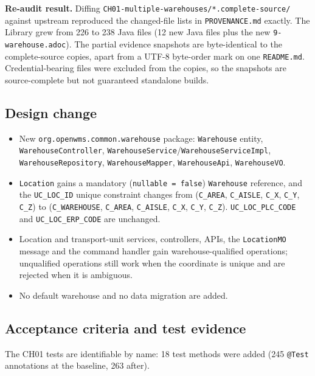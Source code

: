 \documentclass[11pt,a4paper]{article}
\newcommand{\code}[1]{\nolinkurl{#1}}
\begin{document}
\textbf{Re-audit result.} Diffing \code{CH01-multiple-warehouses/*.complete-source/} against upstream reproduced the changed-file lists in \code{PROVENANCE.md} exactly. The Library grew from 226 to 238 Java files (12 new Java files plus the new \code{9-warehouse.adoc}). The partial evidence snapshots are byte-identical to the complete-source copies, apart from a UTF-8 byte-order mark on one \code{README.md}. Credential-bearing files were excluded from the copies, so the snapshots are source-complete but not guaranteed standalone builds.

\subsection{Design change}
\begin{itemize}[nosep]
\item New \code{org.openwms.common.warehouse} package: \code{Warehouse} entity, \code{WarehouseController}, \code{WarehouseService}/\code{WarehouseServiceImpl}, \code{WarehouseRepository}, \code{WarehouseMapper}, \code{WarehouseApi}, \code{WarehouseVO}.
\item \code{Location} gains a mandatory (\code{nullable = false}) \code{Warehouse} reference, and the \code{UC_LOC_ID} unique constraint changes from (\code{C_AREA}, \code{C_AISLE}, \code{C_X}, \code{C_Y}, \code{C_Z}) to (\code{C_WAREHOUSE}, \code{C_AREA}, \code{C_AISLE}, \code{C_X}, \code{C_Y}, \code{C_Z}). \code{UC_LOC_PLC_CODE} and \code{UC_LOC_ERP_CODE} are unchanged.
\item Location and transport-unit services, controllers, APIs, the \code{LocationMO} message and the command handler gain warehouse-qualified operations; unqualified operations still work when the coordinate is unique and are rejected when it is ambiguous.
\item No default warehouse and no data migration are added.
\end{itemize}

\subsection{Acceptance criteria and test evidence}
The CH01 tests are identifiable by name: 18 test methods were added (245 \code{@Test} annotations at the baseline, 263 after).
\end{document}
